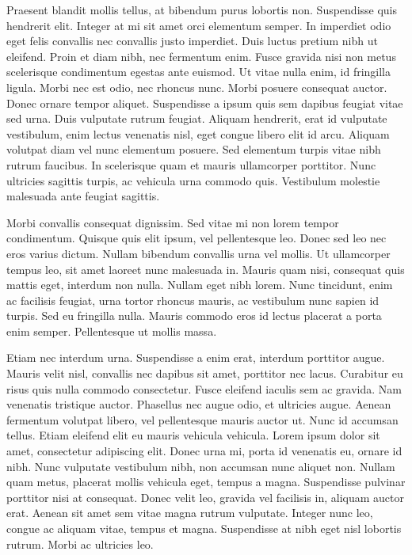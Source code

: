 Praesent blandit mollis tellus, at bibendum purus lobortis non. Suspendisse quis hendrerit elit. Integer at mi sit amet orci elementum semper. In imperdiet odio eget felis convallis nec convallis justo imperdiet. Duis luctus pretium nibh ut eleifend. Proin et diam nibh, nec fermentum enim. Fusce gravida nisi non metus scelerisque condimentum egestas ante euismod. Ut vitae nulla enim, id fringilla ligula. Morbi nec est odio, nec rhoncus nunc. Morbi posuere consequat auctor. Donec ornare tempor aliquet. Suspendisse a ipsum quis sem dapibus feugiat vitae sed urna. Duis vulputate rutrum feugiat. Aliquam hendrerit, erat id vulputate vestibulum, enim lectus venenatis nisl, eget congue libero elit id arcu. Aliquam volutpat diam vel nunc elementum posuere. Sed elementum turpis vitae nibh rutrum faucibus. In scelerisque quam et mauris ullamcorper porttitor. Nunc ultricies sagittis turpis, ac vehicula urna commodo quis. Vestibulum molestie malesuada ante feugiat sagittis.

Morbi convallis consequat dignissim. Sed vitae mi non lorem tempor condimentum. Quisque quis elit ipsum, vel pellentesque leo. Donec sed leo nec eros varius dictum. Nullam bibendum convallis urna vel mollis. Ut ullamcorper tempus leo, sit amet laoreet nunc malesuada in. Mauris quam nisi, consequat quis mattis eget, interdum non nulla. Nullam eget nibh lorem. Nunc tincidunt, enim ac facilisis feugiat, urna tortor rhoncus mauris, ac vestibulum nunc sapien id turpis. Sed eu fringilla nulla. Mauris commodo eros id lectus placerat a porta enim semper. Pellentesque ut mollis massa.

Etiam nec interdum urna. Suspendisse a enim erat, interdum porttitor augue. Mauris velit nisl, convallis nec dapibus sit amet, porttitor nec lacus. Curabitur eu risus quis nulla commodo consectetur. Fusce eleifend iaculis sem ac gravida. Nam venenatis tristique auctor. Phasellus nec augue odio, et ultricies augue. Aenean fermentum volutpat libero, vel pellentesque mauris auctor ut. Nunc id accumsan tellus. Etiam eleifend elit eu mauris vehicula vehicula. Lorem ipsum dolor sit amet, consectetur adipiscing elit. Donec urna mi, porta id venenatis eu, ornare id nibh. Nunc vulputate vestibulum nibh, non accumsan nunc aliquet non. Nullam quam metus, placerat mollis vehicula eget, tempus a magna. Suspendisse pulvinar porttitor nisi at consequat. Donec velit leo, gravida vel facilisis in, aliquam auctor erat. Aenean sit amet sem vitae magna rutrum vulputate. Integer nunc leo, congue ac aliquam vitae, tempus et magna. Suspendisse at nibh eget nisl lobortis rutrum. Morbi ac ultricies leo.

